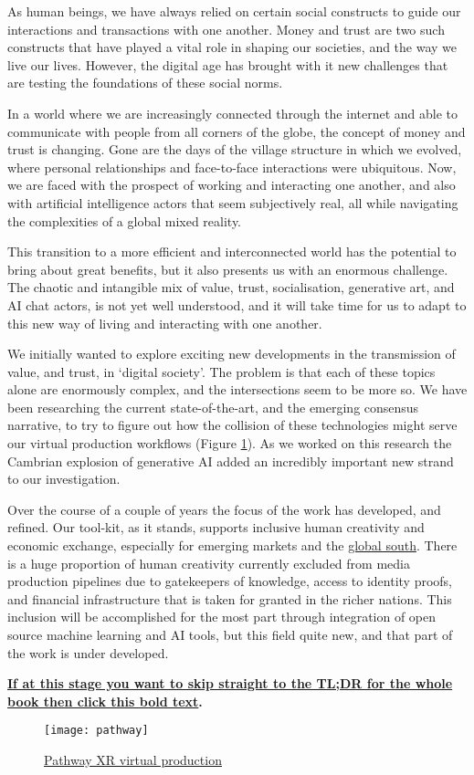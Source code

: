 As human beings, we have always relied on certain social constructs to guide our interactions and transactions with one another. Money and trust are two such constructs that have played a vital role in shaping our societies, and the way we live our lives. However, the digital age has brought with it new challenges that are testing the foundations of these social norms.\par
In a world where we are increasingly connected through the internet and able to communicate with people from all corners of the globe, the concept of money and trust is changing. Gone are the days of the village structure in which we evolved, where personal relationships and face-to-face interactions were ubiquitous. Now, we are faced with the prospect of working and interacting one another, and also with artificial intelligence actors that seem subjectively real, all while navigating the complexities of a global mixed reality.\par
This transition to a more efficient and interconnected world has the potential to bring about great benefits, but it also presents us with an enormous challenge. The chaotic and intangible mix of value, trust, socialisation, generative art, and AI chat actors, is not yet well understood, and it will take time for us to adapt to this new way of living and interacting with one another.\par
We initially wanted to explore exciting new developments in the transmission of value, and trust, in `digital society'. The problem is that each of these topics alone are enormously complex, and the intersections seem to be more so. We have been researching the current state-of-the-art, and the emerging consensus narrative, to try to figure out how the collision of these technologies might serve our virtual production workflows (Figure \ref{fig:pathway}). As we worked on this research the Cambrian explosion of generative AI added an incredibly important new strand to our investigation.\par
Over the course of a couple of years the focus of the work has developed, and refined. Our tool-kit, as it stands, supports inclusive human creativity and economic exchange, especially for emerging markets and the \href{https://www.afrobitcoin.org/}{global south}. There is a huge proportion of human creativity currently excluded from media production pipelines due to gatekeepers of knowledge, access to identity proofs, and financial infrastructure that is taken for granted in the richer nations. This inclusion will be accomplished for the most part through integration of open source machine learning and AI tools, but this field quite new, and that part of the work is under developed.\par

\textbf{\hyperref[sec:tldr]{If at this stage you want to skip straight to the TL;DR for the whole book then click this bold text}.}\par
\begin{figure}
  \centering
   \texttt{[image: pathway]}
 \caption{\href{https://www.pathwayxr.studio/}{Pathway XR virtual production}}
    \label{fig:pathway}
\end{figure}


